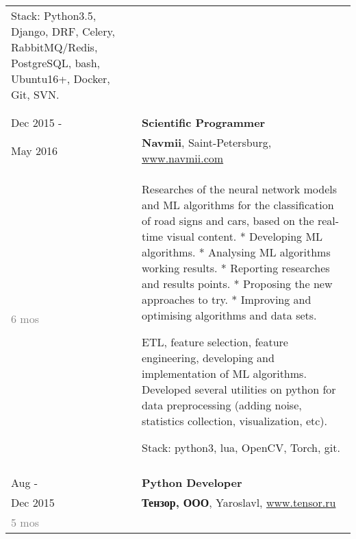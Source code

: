 \documentclass[a4paper,10pt]{article}
\begin{document}
\begin{tabularx}{\textwidth}{lX}
{                                    Stack: Python3.5, Django, DRF, Celery, RabbitMQ/Redis, PostgreSQL, bash, Ubuntu16+, Docker, Git, SVN.\newline
                                } \\

\multicolumn{2}{c}{}\\\\

    Dec 2015 -              &   \textbf{Scientific Programmer} \\
    May 2016                &   \textbf{Navmii}, Saint-Petersburg,
                                \href{www.navmii.com}{www.navmii.com} \\
    \textcolor{gray}
    {6 mos}
                            &   \footnotesize{

                                    Researches of the neural network models and ML algorithms for the classification of road signs and cars, based on the real-time visual content.\newline
                                    * Developing ML algorithms.\newline
                                    * Analysing ML algorithms working results.\newline
                                    * Reporting researches and results points.\newline
                                    * Proposing the new approaches to try.\newline
                                    * Improving and optimising algorithms and data sets.\newline

                                    ETL, feature selection, feature engineering, developing and implementation of ML
                                    algorithms.\newline
                                    Developed several utilities on python for data preprocessing (adding noise,
                                    statistics collection, visualization, etc).\newline

                                    Stack: python3, lua, OpenCV, Torch, git.
                                } \\

\multicolumn{2}{c}{}\\
\pagebreak
\noindent
    
    Aug -                   &   \textbf{Python Developer}\\
    Dec 2015                &   \textbf{Тензор, ООО}, Yaroslavl,
                                \href{www.tensor.ru}{www.tensor.ru} \\
    \textcolor{gray}
    {5 mos} 
                            &   \footnotesize{

}
\end{tabularx}
\end{document}
